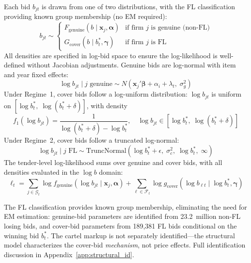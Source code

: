 Each bid $b_{jt}$ is drawn from one of two distributions, with the FL classification providing known group membership (no EM required):
\begin{equation}
  b_{jt} \sim
  \begin{cases}
    F_{\text{genuine}}(b \mid \mathbf{x}_j, \boldsymbol{\alpha}) &
      \text{if firm } j \text{ is genuine (non-FL)} \\
    G_{\text{cover}}(b \mid b^*_t, \boldsymbol{\gamma}) &
      \text{if firm } j \text{ is FL}
  \end{cases}
  \label{eq:mixture}
\end{equation}
All densities are specified in log-bid space to ensure the
log-likelihood is well-defined without Jacobian adjustments.
Genuine bids are log-normal with item and year fixed effects:
\begin{equation}
  \log b_{jt} \mid j \text{ genuine} \sim
  N\!\left(\mathbf{x}_j'\boldsymbol{\beta} + \alpha_i + \lambda_t,
  \; \sigma_g^2\right)
  \label{eq:genuine_dist}
\end{equation}
Under Regime~1, cover bids follow a log-uniform distribution:
$\log b_{jt}$ is uniform on $[\log b^*_t, \; \log(b^*_t + \delta)]$,
with density
\begin{equation}
  f_1(\log b_{jt}) = \frac{1}{\log(b^*_t + \delta) - \log b^*_t},
  \quad \log b_{jt} \in [\log b^*_t, \; \log(b^*_t + \delta)]
  \label{eq:cover_dist_r1}
\end{equation}
Under Regime~2, cover bids follow a truncated log-normal:
\begin{equation}
  \log b_{jt} \mid j \text{ FL} \sim
  \text{TruncNormal}\!\left(\log b^*_t + \epsilon, \;
  \sigma_c^2, \; \log b^*_t, \; \infty\right)
  \label{eq:cover_dist_r2}
\end{equation}
The tender-level log-likelihood sums over genuine and cover bids,
with all densities evaluated in the $\log b$ domain:
\begin{equation}
  \ell_t = \sum_{j \in \mathcal{G}_t} \log f_{\text{genuine}}(\log b_{jt}
  \mid \mathbf{x}_j, \boldsymbol{\alpha})
  + \sum_{\ell \in \mathcal{F}_t} \log g_{\text{cover}}(\log b_{\ell t}
  \mid \log b^*_t, \boldsymbol{\gamma})
  \label{eq:loglik}
\end{equation}

\noindent The FL classification provides known group membership,
eliminating the need for EM estimation: genuine-bid parameters are
identified from 23.2~million non-FL losing bids, and cover-bid
parameters from 189,381 FL bids conditional on the winning bid
$b^*_t$. The cartel markup is not separately identified---the
structural model characterizes the cover-bid \emph{mechanism}, not
price effects. Full identification discussion in
Appendix~\ref{app:structural_id}.

